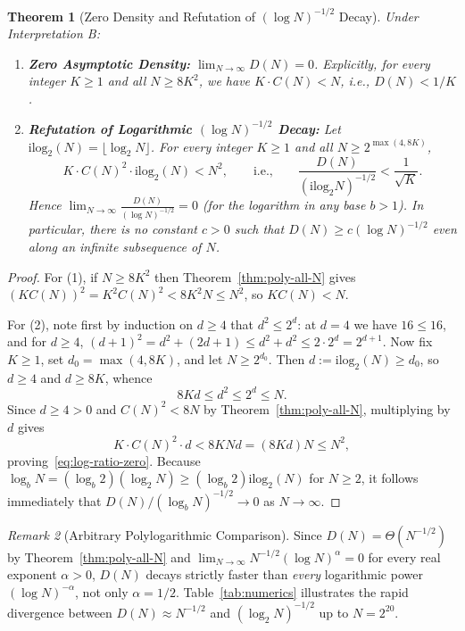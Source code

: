\documentclass[11pt]{article}
\newtheorem{theorem}{Theorem}[section]
\theoremstyle{definition}
\theoremstyle{remark}
\newtheorem{remark}[theorem]{Remark}
\begin{document}
\begin{theorem}[Zero Density and Refutation of $(\log N)^{-1/2}$ Decay]\label{thm:refute-log}
Under Interpretation B:
\begin{enumerate}
  \item \textbf{Zero Asymptotic Density:} $\lim_{N \to \infty} D(N) = 0$. Explicitly, for every integer $K \ge 1$ and all $N \ge 8K^2$, we have $K \cdot C(N) < N$, i.e., $D(N) < 1/K$.
  \item \textbf{Refutation of Logarithmic $(\log N)^{-1/2}$ Decay:} Let $\mathrm{ilog}_2(N) = \lfloor \log_2 N \rfloor$. For every integer $K \ge 1$ and all $N \ge 2^{\max(4, 8K)}$,
  \begin{equation}\label{eq:log-ratio-zero}
    K \cdot C(N)^2 \cdot \mathrm{ilog}_2(N) < N^2, \qquad\text{i.e.,}\qquad \frac{D(N)}{(\mathrm{ilog}_2 N)^{-1/2}} < \frac{1}{\sqrt{K}}.
  \end{equation}
  Hence $\lim_{N \to \infty} \frac{D(N)}{(\log N)^{-1/2}} = 0$ (for the logarithm in any base $b > 1$). In particular, there is no constant $c > 0$ such that $D(N) \ge c (\log N)^{-1/2}$ even along an infinite subsequence of $N$.
\end{enumerate}
\end{theorem}

\begin{proof}
For (1), if $N \ge 8K^2$ then Theorem~\ref{thm:poly-all-N} gives $(K C(N))^2 = K^2 C(N)^2 < 8K^2 N \le N^2$, so $K C(N) < N$.

For (2), note first by induction on $d \ge 4$ that $d^2 \le 2^d$: at $d = 4$ we have $16 \le 16$, and for $d \ge 4$, $(d+1)^2 = d^2 + (2d + 1) \le d^2 + d^2 \le 2 \cdot 2^d = 2^{d+1}$. Now fix $K \ge 1$, set $d_0 = \max(4, 8K)$, and let $N \ge 2^{d_0}$. Then $d := \mathrm{ilog}_2(N) \ge d_0$, so $d \ge 4$ and $d \ge 8K$, whence
\[
  8 K d \le d^2 \le 2^d \le N.
\]
Since $d \ge 4 > 0$ and $C(N)^2 < 8N$ by Theorem~\ref{thm:poly-all-N}, multiplying by $d$ gives
\[
  K \cdot C(N)^2 \cdot d < 8 K N d = (8 K d) N \le N^2,
\]
proving~\eqref{eq:log-ratio-zero}. Because $\log_b N = (\log_b 2)(\log_2 N) \ge (\log_b 2) \mathrm{ilog}_2(N)$ for $N \ge 2$, it follows immediately that $D(N) / (\log_b N)^{-1/2} \to 0$ as $N \to \infty$.
\end{proof}

\begin{remark}[Arbitrary Polylogarithmic Comparison]
Since $D(N) = \Theta(N^{-1/2})$ by Theorem~\ref{thm:poly-all-N} and $\lim_{N \to \infty} N^{-1/2} (\log N)^\alpha = 0$ for every real exponent $\alpha > 0$, $D(N)$ decays strictly faster than \emph{every} logarithmic power $(\log N)^{-\alpha}$, not only $\alpha = 1/2$. Table~\ref{tab:numerics} illustrates the rapid divergence between $D(N) \approx N^{-1/2}$ and $(\log_2 N)^{-1/2}$ up to $N = 2^{20}$.
\end{remark}
\end{document}
